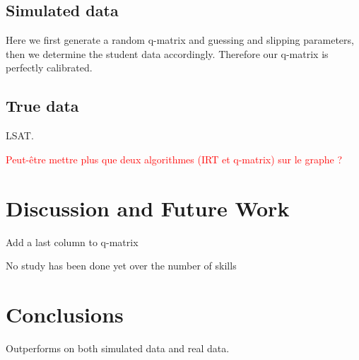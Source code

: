 \documentclass{sig-alternate}
\newcommand\alert[1]{\textcolor{red}{#1}}
\begin{document}
\subsection{Simulated data}

Here we first generate a random q-matrix and guessing and slipping parameters, then we determine the student data accordingly. Therefore our q-matrix is perfectly calibrated.

\subsection{True data}

LSAT.

\alert{Peut-être mettre plus que deux algorithmes (IRT et q-matrix) sur le graphe ?}

\section{Discussion and Future Work}

Add a last column to q-matrix

No study has been done yet over the number of skills

\section{Conclusions}

Outperforms on both simulated data and real data.

%


%
%

\end{document}
